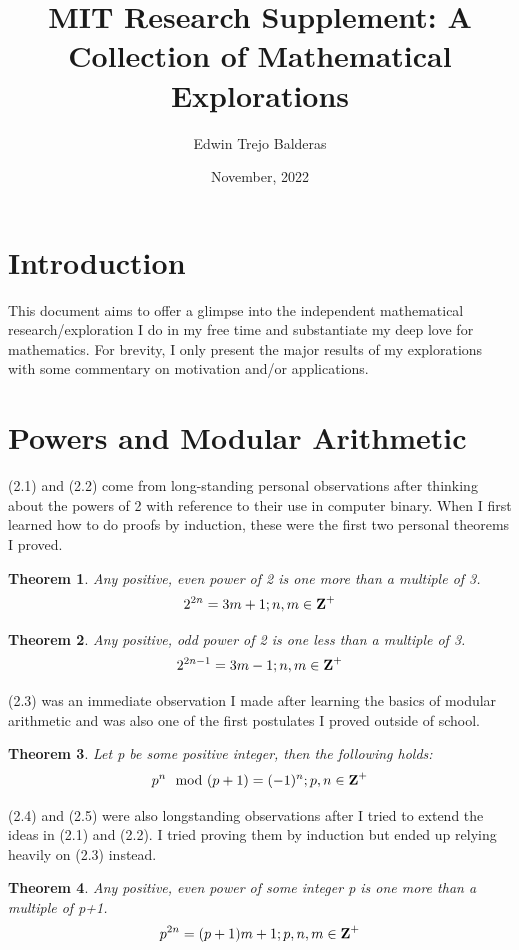\documentclass[11pt]{article}
\title{MIT Research Supplement: A Collection of Mathematical Explorations}
\author{Edwin Trejo Balderas}
\date{November, 2022}
\newtheorem{theorem}{Theorem}[section]
\begin{document}
\maketitle

\section{Introduction}
This document aims to offer a glimpse into the independent mathematical research/exploration I do in my free time and substantiate my deep love for mathematics. For brevity, I only present the major results of my explorations with some commentary on motivation and/or applications.

\section{Powers and Modular Arithmetic}

(2.1) and (2.2) come from long-standing personal observations after thinking about the powers of 2 with reference to their use in computer binary. When I first learned how to do proofs by induction, these were the first two personal theorems I proved.

\begin{theorem}
    Any positive, even power of 2 is one more than a multiple of 3. 
    $$2^{2n}=3m+1;n,m\in\mbox{\textbf{Z}}^+$$
\end{theorem}

\begin{theorem}
    Any positive, odd power of 2 is one less than a multiple of 3. 
    $$2^{2n-1}=3m-1;n,m\in\mbox{\textbf{Z}}^+$$
\end{theorem}

(2.3) was an immediate observation I made after learning the basics of modular arithmetic and was also one of the first postulates I proved outside of school.

\begin{theorem}
    Let \mbox{p} be some positive integer, then the following holds:
    $$p^n\mod{(p+1)}=(-1)^n;p,n\in\mbox{\textbf{Z}}^+$$
\end{theorem}

(2.4) and (2.5) were also longstanding observations after I tried to extend the ideas in (2.1) and (2.2). I tried proving them by induction but ended up relying heavily on (2.3) instead.

\begin{theorem}
    Any positive, even power of some integer \mbox{p} is one more than a multiple of \mbox{p+1}. 
    $$p^{2n}=(p+1)m+1;p,n,m\in\mbox{\textbf{Z}}^+$$
\end{theorem}
\end{document}
